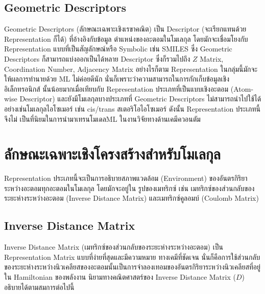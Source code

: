 \subsection{Geometric Descriptors}

Geometric Descriptors (ลักษณะเฉพาะเชิงเรขาคณิต) เป็น Descriptor (จะเรียกแทนด้วย Representation ก็ได้) ที่อ้างอิงกับข้อมูล%
ตำแหน่งของอะตอมในโมเลกุล โดยมักจะเชื่อมโยงกับ Representation แบบที่เป็นสัญลักษณ์หรือ Symbolic เช่น SMILES ซึ่ง Geometric 
Descriptors ก็สามารถแบ่งออกเป็นได้หลาย Descriptor ซึ่งก็รวมไปถึง $Z$ Matrix, Coordination Number, Adjacency Matrix 
อย่างไรก็ตาม Representation ในกลุ่มนี้มักจะให้ผลการทำนายด้วย ML ไม่ค่อยดีนัก นั่นก็เพราะว่าความสามารถในการกักเก็บข้อมูลเชิงอิเล็กทรอนิกส์%
นั้นน้อยมากเมื่อเทียบกับ Representation ประเภทที่เป็นแบบเชิงอะตอม (Atom-wise Descriptor) และยังมีโมเลกุลบางประเภทที่ Geometric 
Descriptors ไม่สามารถนำไปใช้ได้ อย่างเช่นโมเลกุลไอโซเมอร์ เช่น cis/trans สเตอริโอไอโซเมอร์ ดังนั้น Representation ประเภทนี้จึงไม่%
เป็นที่นิยมในการนำมาเทรนโมเดลML ในงานวิจัยทางด้านเคมีควอนตัม\cite{keith2021,musil2021}

\section{ลักษณะเฉพาะเชิงโครงสร้างสำหรับโมเลกุล}

Representation ประเภทนี้จะเป็นการอธิบายสภาพแวดล้อม (Environment) ของอันตรกิริยาระหว่างอะตอมทุกอะตอมในโมเลกุล โดยมักจะอยู่ใน%
รูปของเมทริกซ์ เช่น เมทริกซ์ของส่วนกลับของระยะห่างระหว่างอะตอม (Inverse Distance Matrix) และเมทริกซ์คูลอมบ์ (Coulomb Matrix)

\subsection{Inverse Distance Matrix}

Inverse Distance Matrix (เมทริกซ์ของส่วนกลับของระยะห่างระหว่างอะตอม) เป็น Representation Matrix แบบที่ง่ายที่สุดและมีความหมาย%
ทางเคมีที่ชัดเจน นั่นก็คือการใช้ส่วนกลับของระยะห่างระหว่างนิวเคลียสของอะตอมนั้นเป็นการจำลองเทอมของอันตรกิริยาระหว่างนิวเคลียสที่อยู่ใน 
Hamiltonian ของพลังงาน นิยามทางคณิตศาสตร์ของ Inverse Distance Matrix ($D$) อธิบายได้ตามสมการต่อไปนี้

